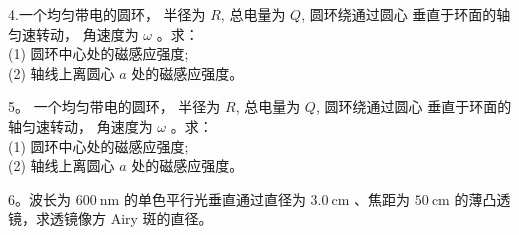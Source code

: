 4.一个均匀带电的圆环， 半径为 $R$, 总电量为 $Q$, 圆环绕通过圆心
垂直于环面的轴匀速转动， 角速度为 $\omega$ 。求：\\
(1) 圆环中心处的磁感应强度;\\
(2) 轴线上离圆心 $a$ 处的磁感应强度。

5。 一个均匀带电的圆环， 半径为 $R$, 总电量为 $Q$, 圆环绕通过圆心 垂直于环面的轴匀速转动， 角速度为 $\omega$ 。求：\\
(1) 圆环中心处的磁感应强度;\\
(2) 轴线上离圆心 $a$ 处的磁感应强度。

6。波长为 $600 \mathrm{~nm}$ 的单色平行光垂直通过直径为 $3.0 \mathrm{~cm}$ 、焦距为 $50 \mathrm{~cm}$ 的薄凸透镜，求透镜像方 Airy 斑的直径。
